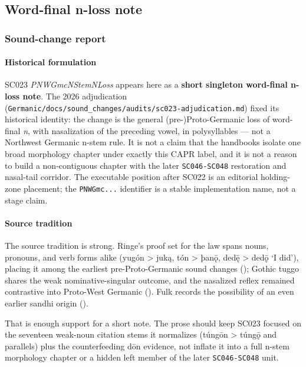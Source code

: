 \documentclass[
  british,
  a4paper,
]{article}
\begin{document}
\subsection{Word-final n-loss note}\label{word-final-n-loss-note}

\subsubsection{Sound-change report}\label{sound-change-report-16}

\paragraph{Historical formulation}\label{historical-formulation-16}

SC023 \emph{PNWGmcNStemNLoss} appears here as a \textbf{short singleton
word-final n-loss note}. The 2026 adjudication
(\texttt{Germanic/docs/sound\_changes/audits/sc023-adjudication.md})
fixed its historical identity: the change is the general
(pre-)Proto-Germanic loss of word-final \emph{n}, with nasalization of
the preceding vowel, in polysyllables --- not a Northwest Germanic
n-stem rule. It is not a claim that the handbooks isolate one broad
morphology chapter under exactly this CAPR label, and it is not a reason
to build a non-contiguous chapter with the later \texttt{SC046-SC048}
restoration and nasal-tail corridor. The executable position after SC022
is an editorial holding-zone placement; the \texttt{PNWGmc...}
identifier is a stable implementation name, not a stage claim.

\paragraph{Source tradition}\label{source-tradition-16}

The source tradition is strong. Ringe's proof set for the law spans
nouns, pronouns, and verb forms alike (yugón \textgreater{} juką, tón
\textgreater{} þanǭ, dedę̄ \textgreater{} dedǭ `I did'), placing it among
the earliest pre-Proto-Germanic sound changes
(); Gothic tuggo shares the
weak nominative-singular outcome, and the nasalized reflex remained
contrastive into Proto-West Germanic
().
Fulk records the possibility of an even earlier sandhi origin
().

That is enough support for a short note. The prose should keep SC023
focused on the seventeen weak-noun citation stems it normalizes (túngōn
\textgreater{} túngǭ and parallels) plus the counterfeeding dōn
evidence, not inflate it into a full n-stem morphology chapter or a
hidden left member of the later \texttt{SC046-SC048} unit.
\end{document}
